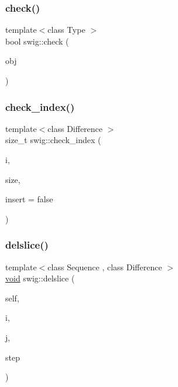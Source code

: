 \mbox{\label{namespaceswig_a428f235cf1ad33edc806647c1392240d}} 
\subsubsection{\texorpdfstring{check()}{check()}}
{\footnotesize\ttfamily template$<$class Type $>$ \\
bool swig\+::check (\begin{DoxyParamCaption}\item[{Py\+Object $\ast$}]{obj }\end{DoxyParamCaption})\hspace{0.3cm}{\ttfamily [inline]}}

\mbox{\label{namespaceswig_ad634e52c1b165ad5b3b7dcfda9eccec0}} 
\subsubsection{\texorpdfstring{check\+\_\+index()}{check\_index()}}
{\footnotesize\ttfamily template$<$class Difference $>$ \\
size\+\_\+t swig\+::check\+\_\+index (\begin{DoxyParamCaption}\item[{Difference}]{i,  }\item[{size\+\_\+t}]{size,  }\item[{bool}]{insert = {\ttfamily false} }\end{DoxyParamCaption})\hspace{0.3cm}{\ttfamily [inline]}}

\mbox{\label{namespaceswig_a9d3d629d8459e58b1e78a5a1ff378bf0}} 
\subsubsection{\texorpdfstring{delslice()}{delslice()}}
{\footnotesize\ttfamily template$<$class Sequence , class Difference $>$ \\
\hyperlink{lp__lib_8h_ac7828c7b2b31d2e11af17bdb6289c5d9}{void} swig\+::delslice (\begin{DoxyParamCaption}\item[{Sequence $\ast$}]{self,  }\item[{Difference}]{i,  }\item[{Difference}]{j,  }\item[{\hyperlink{libstructural__wrap__python_8cpp_a47424a8953c340f500027db7e6c00173}{Py\+\_\+ssize\+\_\+t}}]{step }\end{DoxyParamCaption})\hspace{0.3cm}{\ttfamily [inline]}}

